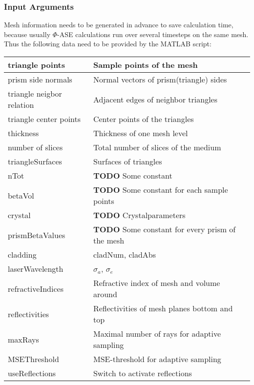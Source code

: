 \subsubsection{Input Arguments}
Mesh information needs to be generated in advance
to save calculation time, because usually $\Phi$-ASE calculations
run over several timesteps on the same mesh. Thus the following
data need to be provided by the MATLAB script:
\label{label:input}
\begin{flushleft}
\begin{supertabular}{| p{3cm} | p{4cm} |}
  triangle points & Sample points of the mesh \\\hline
  prism side normals & Normal vectors of prism(triangle) sides\\\hline
  triangle neigbor relation & Adjacent edges of neighbor triangles\\\hline
  triangle center points & Center points of the triangles\\\hline
  thickness & Thickness of one mesh level \\\hline
  number of slices & Total number of slices of the medium \\\hline
  triangleSurfaces & Surfaces of triangles \\\hline
  \hline
  nTot & \textbf{TODO} Some constant \\\hline
  betaVol & \textbf{TODO} Some constant for each sample points \\\hline
  crystal & \textbf{TODO} Crystalparameters \\\hline
  prismBetaValues & \textbf{TODO} Some constant for every prism of the mesh \\\hline
  cladding & cladNum, cladAbs \\\hline
  \hline
  laserWavelength & $\sigma_a$, $\sigma_e$ \\\hline
  \hline
  refractiveIndices &  Refractive index of mesh and volume around \\\hline
  reflectivities & Reflectivities of mesh planes bottom and top \\\hline
  \hline
  maxRays & Maximal number of rays for adaptive sampling \\\hline
  MSEThreshold & MSE-threshold for adaptive sampling \\\hline
  useReflections & Switch to activate reflections \\\hline
\end{supertabular}



\end{flushleft}
